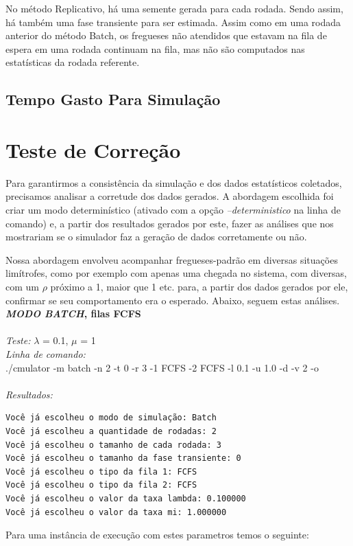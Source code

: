 \documentclass[a4paper,10pt]{article}
\begin{document}
    No método Replicativo, há uma semente gerada para cada rodada. Sendo assim, há também uma fase transiente para ser estimada. Assim como em uma rodada anterior do método Batch, os fregueses não atendidos que estavam na fila de espera em uma rodada continuam na fila, mas não são computados nas estatísticas da rodada referente.


\subsection{Tempo Gasto Para Simulação}

\pagebreak

\section{Teste de Correção}

    Para garantirmos a consistência da simulação e dos dados estatísticos coletados, precisamos analisar a corretude dos dados gerados. A abordagem escolhida foi criar um modo determinístico (ativado com a opção \emph{--deterministico} na linha de comando) e, a partir dos resultados gerados por este, fazer as análises que nos mostrariam se o simulador faz a geração de dados corretamente ou não.

    Nossa abordagem envolveu acompanhar fregueses-padrão em diversas situações limítrofes, como por exemplo com apenas uma chegada no sistema, com diversas, com um $\rho$ próximo a 1, maior que 1 etc. para, a partir dos dados gerados por ele, confirmar se seu comportamento era o esperado. Abaixo, seguem estas análises.
\\
\textbf{\emph{MODO BATCH}, filas FCFS}
\\
\\
\emph{Teste:} $\lambda$ = 0.1, $\mu$ = 1
\\
\emph{Linha de comando:}
\\
./cmulator -m batch -n 2 -t 0 -r 3 -1 FCFS -2 FCFS -l 0.1 -u 1.0 -d -v 2 -o
\\
\\
\emph{Resultados:}
\\
\begin{verbatim}
Você já escolheu o modo de simulação: Batch
Você já escolheu a quantidade de rodadas: 2
Você já escolheu o tamanho de cada rodada: 3
Você já escolheu o tamanho da fase transiente: 0
Você já escolheu o tipo da fila 1: FCFS
Você já escolheu o tipo da fila 2: FCFS
Você já escolheu o valor da taxa lambda: 0.100000
Você já escolheu o valor da taxa mi: 1.000000

\end{verbatim}
Para uma instância de execução com estes parametros temos o seguinte:
\end{document}
